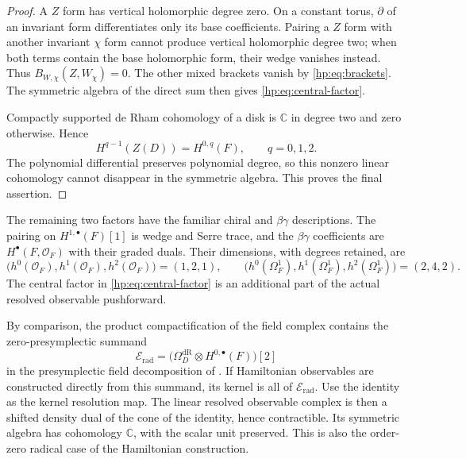 \begin{proof}
A $Z$ form has vertical holomorphic degree zero. On a constant
torus, $\partial$ of an invariant form differentiates only its
base coefficients. Pairing a $Z$ form with another invariant
$\chi$ form cannot produce vertical holomorphic degree two;
when both terms contain the base holomorphic form, their wedge
vanishes instead. Thus $B_{W,\chi}(Z,W_\chi)=0$.
The other mixed brackets vanish by
\eqref{hp:eq:brackets}. The symmetric algebra of the direct sum
then gives \eqref{hp:eq:central-factor}.

Compactly supported de Rham cohomology of a disk is $\mathbb C$
in degree two and zero otherwise. Hence
\begin{equation}\label{hp:eq:central-cohomology}
 H^{q-1}(Z(D))=H^{0,q}(F),\qquad q=0,1,2.
\end{equation}
The polynomial differential preserves polynomial degree, so this
nonzero linear cohomology cannot disappear in the symmetric
algebra. This proves the final assertion.
\end{proof}

The remaining two factors have the familiar chiral and
$\beta\gamma$ descriptions. The pairing on $H^{1,\bullet}(F)[1]$
is wedge and Serre trace, and the $\beta\gamma$ coefficients are
$H^\bullet(F,\mathcal O_F)$ with their graded duals. Their
dimensions, with degrees retained, are
\[
 \bigl(h^0(\mathcal O_F),h^1(\mathcal O_F),h^2(\mathcal O_F)\bigr)
 =(1,2,1),\qquad
 \bigl(h^0(\Omega_F^1),h^1(\Omega_F^1),h^2(\Omega_F^1)\bigr)
 =(2,4,2).
\]
The central factor in \eqref{hp:eq:central-factor} is an additional
part of the actual resolved observable pushforward.

By comparison, the product compactification of the field complex
contains the zero-presymplectic summand
\begin{equation}\label{hp:eq:zero-field}
 \mathcal E_{\mathrm{rad}}
 =\bigl(\Omega_D^{\mathrm{dR}}\otimes
                    H^{0,\bullet}(F)\bigr)[2]
\end{equation}
in the presymplectic field decomposition of
\cite[\S7.1.2]{SaberiWilliamsConstraints}. If Hamiltonian
observables are constructed directly from this summand, its
kernel is all of $\mathcal E_{\mathrm{rad}}$. Use the identity
as the kernel resolution map. The linear resolved observable
complex is then a shifted density dual of the cone of the
identity, hence contractible. Its symmetric algebra has
cohomology $\mathbb C$, with the scalar unit preserved. This is
also the order-zero radical case of the Hamiltonian construction.

